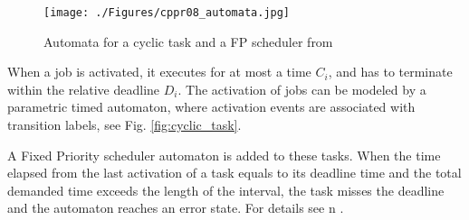 \documentclass{article}
\begin{document}
\begin{figure}[!ht]
 \centering
 \texttt{[image: ./Figures/cppr08\_automata.jpg]}
 \caption{Automata for a cyclic task and a FP scheduler from \cite{cpr08}}
 \label{fig:cpr08-aut}
\end{figure}

When a job is activated, it executes
for at most a time $C_i$, and has to terminate within the
relative deadline $D_i$. The activation of jobs can be modeled by a parametric
timed automaton, where activation events are associated with transition labels, see Fig. \ref{fig:cyclic_task}.

A Fixed Priority scheduler automaton is added to these tasks. When the time
elapsed from the last activation of a task equals to its deadline
time and the total demanded time exceeds the length of
the interval, the task misses the deadline and the automaton reaches an error state. For details see n \cite{cpr08}.
\end{document}

